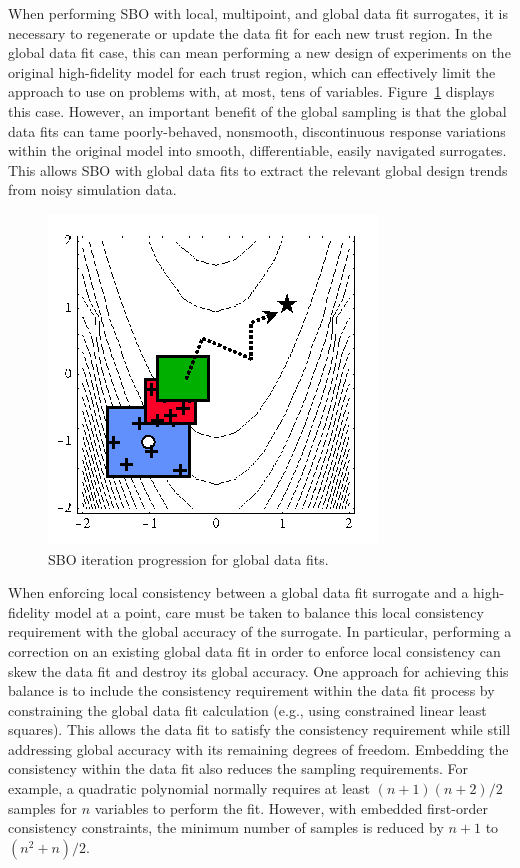 When performing SBO with local, multipoint, and global data fit
surrogates, it is necessary to regenerate or update the data fit for
each new trust region.  In the global data fit case, this can mean
performing a new design of experiments on the original high-fidelity
model for each trust region, which can effectively limit the approach
to use on problems with, at most, tens of variables.
Figure~\ref{fig:sbo_df} displays this case.  However, an important
benefit of the global sampling is that the global data fits can tame
poorly-behaved, nonsmooth, discontinuous response variations within
the original model into smooth, differentiable, easily navigated
surrogates.  This allows SBO with global data fits to extract the
relevant global design trends from noisy simulation data.

\begin{figure}
  \centering
  \includegraphics[width=.3\textwidth]{images/sbo_df}
  \caption{SBO iteration progression for global data fits.}
  \label{fig:sbo_df}
\end{figure}
When enforcing local consistency between a global data fit surrogate
and a high-fidelity model at a point, care must be taken to balance
this local consistency requirement with the global accuracy of the
surrogate.  In particular, performing a correction on an existing
global data fit in order to enforce local consistency can skew the
data fit and destroy its global accuracy.  One approach for achieving
this balance is to include the consistency requirement within the data
fit process by constraining the global data fit calculation (e.g.,
using constrained linear least squares).  This allows the data fit to
satisfy the consistency requirement while still addressing global
accuracy with its remaining degrees of freedom.
Embedding the consistency within the data fit also reduces the
sampling requirements.  For example, a quadratic polynomial normally
requires at least $(n+1)(n+2)/2$ samples for $n$ variables to perform
the fit.  However, with embedded first-order consistency constraints,
the minimum number of samples is reduced by $n+1$ to $(n^2+n)/2$.
